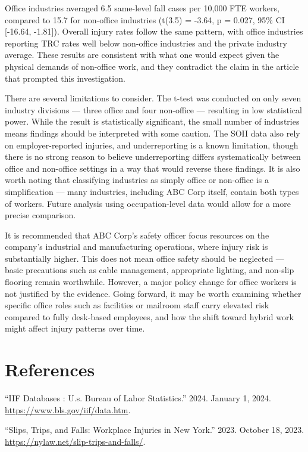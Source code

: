 \documentclass[
  letterpaper,
  DIV=11,
  numbers=noendperiod]{scrreprt}
\newlength{\cslhangindent}
\newenvironment{CSLReferences}[2] %
 {\begin{list}{}{%
  \setlength{\itemindent}{0pt}
  \setlength{\leftmargin}{0pt}
  \setlength{\parsep}{0pt}
  \ifodd #1
   \setlength{\leftmargin}{\cslhangindent}
   \setlength{\itemindent}{-1\cslhangindent}
  \fi
  \setlength{\itemsep}{#2\baselineskip}}}
 {\end{list}}
\begin{document}
Office industries averaged 6.5 same-level fall cases per 10,000 FTE
workers, compared to 15.7 for non-office industries (t(3.5) = -3.64, p =
0.027, 95\% CI {[}-16.64, -1.81{]}). Overall injury rates follow the
same pattern, with office industries reporting TRC rates well below
non-office industries and the private industry average. These results
are consistent with what one would expect given the physical demands of
non-office work, and they contradict the claim in the article that
prompted this investigation.

There are several limitations to consider. The t-test was conducted on
only seven industry divisions --- three office and four non-office ---
resulting in low statistical power. While the result is statistically
significant, the small number of industries means findings should be
interpreted with some caution. The SOII data also rely on
employer-reported injuries, and underreporting is a known limitation,
though there is no strong reason to believe underreporting differs
systematically between office and non-office settings in a way that
would reverse these findings. It is also worth noting that classifying
industries as simply office or non-office is a simplification --- many
industries, including ABC Corp itself, contain both types of workers.
Future analysis using occupation-level data would allow for a more
precise comparison.

It is recommended that ABC Corp's safety officer focus resources on the
company's industrial and manufacturing operations, where injury risk is
substantially higher. This does not mean office safety should be
neglected --- basic precautions such as cable management, appropriate
lighting, and non-slip flooring remain worthwhile. However, a major
policy change for office workers is not justified by the evidence. Going
forward, it may be worth examining whether specific office roles such as
facilities or mailroom staff carry elevated risk compared to fully
desk-based employees, and how the shift toward hybrid work might affect
injury patterns over time.


\chapter*{References}\label{references}


\label{refs}
\begin{CSLReferences}{1}{0}
{``{IIF} Databases : U.s. Bureau of Labor Statistics.''} 2024. January
1, 2024. \url{https://www.bls.gov/iif/data.htm}.

{``Slips, {Trips}, and {Falls}: {Workplace Injuries} in {New York}.''}
2023. October 18, 2023. \url{https://nylaw.net/slip-trips-and-falls/}.

\end{CSLReferences}
\end{document}
